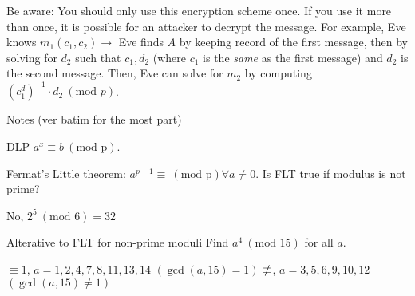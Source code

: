 \begin{note}
    Be aware: You should only use this encryption scheme once. If you use it more than once, it is possible for an attacker to decrypt the message. For example, Eve knows \(m_1(c_1, c_2) \rightarrow\) Eve finds \(A\) by keeping record of the first message, then by solving for \(d_2\) such that \(c_1, d_2\) (where \(c_1\) is the \textit{same} as the first message) and \(d_2\) is the second message. Then, Eve can solve for \(m_2\) by computing \((c_1^d)^{-1} \cdot d_2 \ (\text{mod } p)\).
\end{note}

\underline{\hfill}

Notes (ver batim for the most part)

DLP \(a^x \equiv b \ (\text{mod p})\).

Fermat's Little theorem: \(a^{p - 1} \equiv \ (\text{mod p}) \forall a \ne 0\). 
Is FLT true if modulus is not prime? 

No, \(2^5 \ (\text{mod 6}) = 32 \)

\begin{example}
    {Alterative to FLT for non-prime moduli} Find \(a^4 \ (\text{mod 15})\) for all \(a\). 
\end{example}

\(\equiv 1\), \(a=1,2,4,7,8,11,13,14\) \((\gcd(a,15) = 1)\)
\(\slashed{\equiv}\), \(a =3,5,6,9,10,12\) \((\gcd(a,15) \ne 1)\)